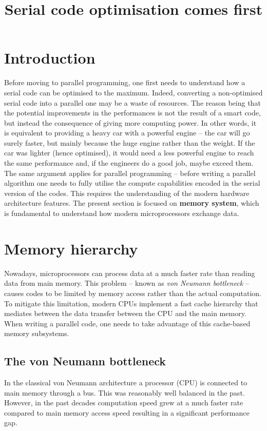 \documentclass[12pt,twoside,english]{paper}
\begin{document}
\newcommand{\T}[1]{\textrm{#1}}
\newcommand{\red}[1]{\textcolor{red}{#1}}
\renewcommand{\it}[1]{\textit{#1}}
\renewcommand{\L}{\mathcal{L}}
\newcommand{\A}{\mathcal{A}}
\renewcommand{\a}{\alpha}
\newcommand{\pmu}{\partial_{\mu}}
\newcommand{\pnu}{\partial_{\nu}}
\newcommand{\pt}{\partial_t}
\newcommand{\tphi}{\tilde{\phi}}
\newcommand{\tL}{\tilde{L}}
\newcommand{\hlorange}[1]{\colorbox{orange!50}{$\displaystyle#1$}}
\renewcommand{\tilde}[1]{\widetilde{#1}}

\title{Serial code optimisation comes first}

\maketitle

\section{Introduction}
Before moving to parallel programming, one first needs to understand how a serial code can be optimised to the maximum. Indeed, converting
a non-optimised serial code into a parallel one may be a waste of resources. The reason being that the potential improvements in the
performances is not the result of a smart code, but instead the consequence of giving more computing power. In other words, it is equivalent
to providing a heavy car with a powerful engine -- the car will go surely faster, but mainly because the huge engine rather than the weight.
If the car was lighter (hence optimised), it would need a less powerful engine to reach the same performance and, if the engineers do a good job,
maybe exceed them. The same argument applies for parallel programming -- before writing a parallel algorithm one needs to fully utilise the 
compute capabilities encoded in the serial version of the codes. This requires the understanding of the modern hardware architecture features.
The present section is focused on \textbf{memory system}, which is fundamental to understand how modern microprocessors exchange data.

\section{Memory hierarchy}
Nowadays, microprocessors can process data at a much faster rate than reading data from main memory. This problem -- known as \textit{von Neumann bottleneck} --
causes codes to be limited by memory access rather than the actual computation. To mitigate this limitation, modern CPUs implement a fast cache hierarchy that
mediates between the data transfer between the CPU and the main memory. When writing a parallel code, one needs to take advantage of this cache-based memory
subsystems.

\subsection{The von Neumann bottleneck}
In the classical von Neumann architecture a processor (CPU) is connected to main memory through a bus. This was reasonably well balanced in the past. However,
in the past decades computation speed grew at a much faster rate compared to main memory access speed resulting in a significant performance gap.
\end{document}
